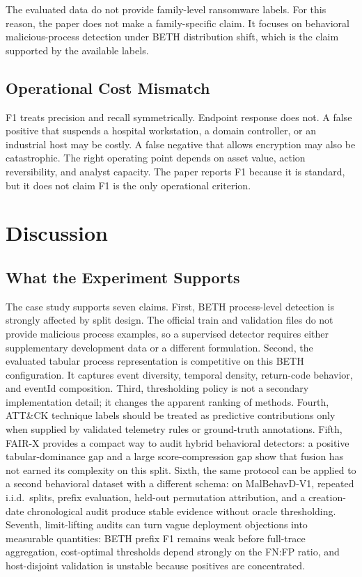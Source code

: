 \documentclass[10pt,journal,compsoc]{IEEEtran}
\begin{document}
The evaluated data do not provide family-level ransomware labels. For this reason, the paper does not make a family-specific claim. It focuses on behavioral malicious-process detection under BETH distribution shift, which is the claim supported by the available labels.

\subsection{Operational Cost Mismatch}

F1 treats precision and recall symmetrically. Endpoint response does not. A false positive that suspends a hospital workstation, a domain controller, or an industrial host may be costly. A false negative that allows encryption may also be catastrophic. The right operating point depends on asset value, action reversibility, and analyst capacity. The paper reports F1 because it is standard, but it does not claim F1 is the only operational criterion.

\section{Discussion}
\label{sec:discussion}

\subsection{What the Experiment Supports}

The case study supports seven claims. First, BETH process-level detection is strongly affected by split design. The official train and validation files do not provide malicious process examples, so a supervised detector requires either supplementary development data or a different formulation. Second, the evaluated tabular process representation is competitive on this BETH configuration. It captures event diversity, temporal density, return-code behavior, and eventId composition. Third, thresholding policy is not a secondary implementation detail; it changes the apparent ranking of methods. Fourth, ATT\&CK technique labels should be treated as predictive contributions only when supplied by validated telemetry rules or ground-truth annotations. Fifth, FAIR-X provides a compact way to audit hybrid behavioral detectors: a positive tabular-dominance gap and a large score-compression gap show that fusion has not earned its complexity on this split. Sixth, the same protocol can be applied to a second behavioral dataset with a different schema: on MalBehavD-V1, repeated i.i.d.\ splits, prefix evaluation, held-out permutation attribution, and a creation-date chronological audit produce stable evidence without oracle thresholding. Seventh, limit-lifting audits can turn vague deployment objections into measurable quantities: BETH prefix F1 remains weak before full-trace aggregation, cost-optimal thresholds depend strongly on the FN:FP ratio, and host-disjoint validation is unstable because positives are concentrated.
\end{document}
